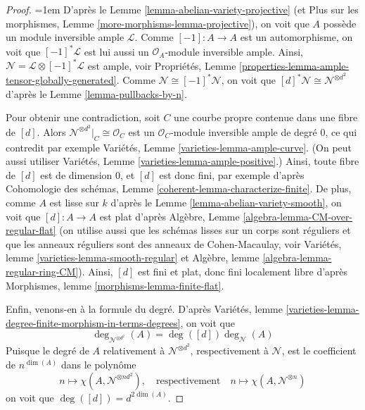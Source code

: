 \begin{proof}
{\emergencystretch=1em D'après le Lemme \ref{lemma-abelian-variety-projective}
(et Plus sur les morphismes, Lemme \ref{more-morphisms-lemma-projective}),
on voit que $A$ possède un module inversible ample $\mathcal{L}$.
Comme $[-1] : A \to A$ est un automorphisme, on voit que
$[-1]^*\mathcal{L}$ est lui aussi un $\mathcal{O}_A$-module inversible ample.
Ainsi, $\mathcal{N} = \mathcal{L} \otimes [-1]^*\mathcal{L}$
est ample, voir
Propriétés, Lemme \ref{properties-lemma-ample-tensor-globally-generated}.
Comme $\mathcal{N} \cong [-1]^*\mathcal{N}$, on voit que
$[d]^*\mathcal{N} \cong \mathcal{N}^{\otimes d^2}$ d'après le
Lemme \ref{lemma-pullbacks-by-n}.\par}

\medskip\noindent
Pour obtenir une contradiction, soit $C$ une courbe propre contenue dans une
fibre de $[d]$. Alors $\mathcal{N}^{\otimes d^2}|_C \cong \mathcal{O}_C$
est un $\mathcal{O}_C$-module inversible ample de degré $0$, ce qui
contredit par exemple Variétés, Lemme \ref{varieties-lemma-ample-curve}.
(On peut aussi utiliser Variétés, Lemme \ref{varieties-lemma-ample-positive}.)
Ainsi, toute fibre de $[d]$ est de dimension $0$, et $[d]$ est donc fini,
par exemple d'après Cohomologie des schémas, Lemme
\ref{coherent-lemma-characterize-finite}.
De plus, comme $A$ est lisse sur $k$ d'après le
Lemme \ref{lemma-abelian-variety-smooth},
on voit que $[d] : A \to A$ est plat d'après
Algèbre, Lemme \ref{algebra-lemma-CM-over-regular-flat}
(on utilise aussi que les schémas lisses sur un corps sont réguliers et que
les anneaux réguliers sont des anneaux de Cohen-Macaulay, voir
Variétés, lemme \ref{varieties-lemma-smooth-regular} et
Algèbre, lemme \ref{algebra-lemma-regular-ring-CM}).
Ainsi, $[d]$ est fini et plat, donc fini localement libre d'après
Morphismes, lemme \ref{morphisms-lemma-finite-flat}.

\medskip\noindent
Enfin, venons-en à la formule du degré. D'après
Variétés, lemme \ref{varieties-lemma-degree-finite-morphism-in-terms-degrees},
on voit que
$$
\deg_{\mathcal{N}^{\otimes d^2}}(A) = \deg([d]) \deg_\mathcal{N}(A)
$$
Puisque le degré de $A$ relativement à
$\mathcal{N}^{\otimes d^2}$, respectivement à $\mathcal{N}$,
est le coefficient de $n^{\dim(A)}$ dans le polynôme
$$
n \longmapsto \chi(A, \mathcal{N}^{\otimes nd^2}),\quad
\text{respectivement}\quad n \longmapsto \chi(A, \mathcal{N}^{\otimes n})
$$
on voit que $\deg([d]) = d^{2 \dim(A)}$.
\end{proof}

